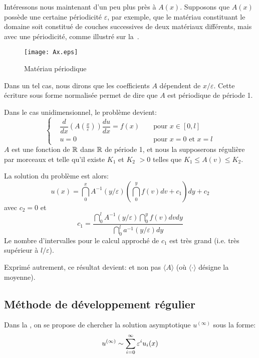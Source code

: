 \medskip
Intéressons nous maintenant d'un peu plus près à $A(x)$.
Supposons que $A(x)$ possède une certaine périodicité $\varepsilon$,
par exemple, que le matériau constituant le domaine soit constitué de couches successives
de deux matériaux différents, mais avec une périodicité, comme illustré sur la~.
\begin{figure}[ht]
\centering\texttt{[image: Ax.eps]}
\caption{Matériau périodique}\label{Fig-Ax}
\end{figure}
Dans un tel cas, nous dirons que les coefficients $A$ dépendent de $x/\varepsilon$.
Cette écriture sous forme normalisée permet de dire que $A$ est périodique de période 1.

Dans le cas unidimensionnel, le problème devient:
\begin{equation}
\left\{
\begin{aligned}
&\dfrac d{dx}\left(A(\frac x\varepsilon)\right) \dfrac{du}{dx} = f(x)&& \text{ pour } x\in[0,l]\\
&u=0 &&\text{ pour } x=0 \text{ et } x=l
\end{aligned}
\right.
\end{equation}
$A$ est une fonction de $\mathbb R$ dans $\mathbb R$ de période 1, et nous la supposerons régulière
par morceaux et telle qu'il existe $K_1$ et $K_2$ $>0$ telles que $K_1\le A(v)\le K_2$.

La solution du problème est alors:
\begin{equation}
u(x)=\dint_0^x A^{-1}(y/\varepsilon) \left(\dint_0^y f(v)dv + c_1 \right) dy + c_2
\end{equation}
avec $c_2=0$ et
\begin{equation} c_1 = \dfrac{\dint_0^l A^{-1}(y/\varepsilon)\dint_0^y f(v)dv dy}{\dint_0^l a^{-1}(y/\varepsilon)dy} \end{equation}
Le nombre d'intervalles pour le calcul approché de $c_1$ est très grand (i.e. très supérieur
à $l/\varepsilon$).

Exprimé autrement, ce résultat devient:
 et non pas $\langle A\rangle$
(où $\langle\cdot\rangle$ désigne la moyenne).


\medskip
\subsection{Méthode de développement régulier}

Dans la , on se propose de chercher la
solution asymptotique $u^{(\infty)}$ sous la forme:
\begin{equation}
u^{(\infty)} \sim \displaystyle\sum_{i=0}^\infty \varepsilon^iu_i(x)
\end{equation}

